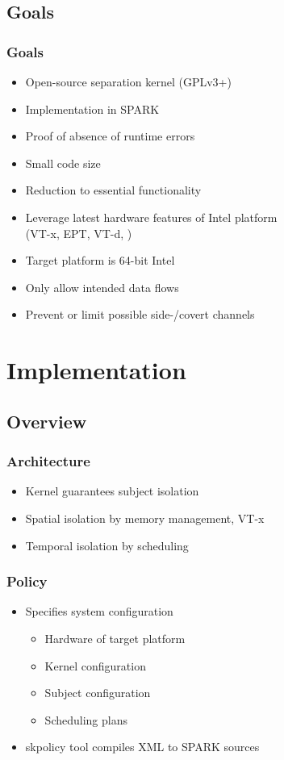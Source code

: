 \documentclass[xcolor={dvipsnames}]{beamer}
\begin{document}
\subsection{Goals}
\begin{frame}\frametitle{Goals}
\begin{itemize}
	\item Open-source separation kernel (GPLv3+)
	\item Implementation in SPARK
	\item Proof of absence of runtime errors
	\item Small code size
	\item Reduction to essential functionality
	\item Leverage latest hardware features of Intel platform\\(VT-x, EPT, VT-d, \textellipsis)
	\item Target platform is 64-bit Intel
	\item Only allow intended data flows
	\item Prevent or limit possible side-/covert channels
\end{itemize}
\end{frame}

\section{Implementation}
\subsection{Overview}
\begin{frame}\frametitle{Architecture}
\begin{itemize}
	\item Kernel guarantees subject isolation
	\item Spatial isolation by memory management, VT-x
	\item Temporal isolation by scheduling
\end{itemize}
\begin{center}
	
\end{center}
\end{frame}

\begin{frame}\frametitle{Policy}
\begin{itemize}
	\item Specifies system configuration
	\begin{itemize}
		\item Hardware of target platform
		\item Kernel configuration
		\item Subject configuration
		\item Scheduling plans
	\end{itemize}
	\item skpolicy tool compiles XML to SPARK sources
\end{itemize}

\end{frame}
\end{document}
